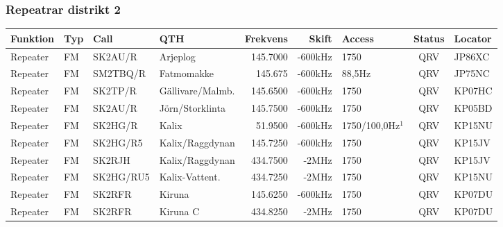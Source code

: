 \begin{landscape}
\subsubsection{Repeatrar distrikt 2}
\footnotesize
\begin{longtable}{llllrrlcl}
\textbf{Funktion}                 & \textbf{Typ}  & \textbf{Call} & \textbf{QTH}        & \textbf{Frekvens} & \textbf{Skift} & \textbf{Access}  & \textbf{Status} & \textbf{Locator} \\ \hline \endhead
Repeater                          & FM            & SK2AU/R       & Arjeplog            & 145.7000          & -600kHz        & 1750             & QRV             & JP86XC           \\
Repeater                          & FM            & SM2TBQ/R      & Fatmomakke          & 145.675           & -600kHz        & 88,5Hz           & QRV             & JP75NC           \\
Repeater                          & FM            & SK2TP/R       & Gällivare/Malmb.    & 145.6500          & -600kHz        & 1750             & QRV             & KP07HC           \\
Repeater                          & FM            & SK2AU/R       & Jörn/Storklinta     & 145.7500          & -600kHz        & 1750             & QRV             & KP05BD           \\
Repeater                          & FM            & SK2HG/R       & Kalix               & 51.9500           & -600kHz        & 1750/100,0Hz$^1$ & QRV             & KP15NU           \\
Repeater                          & FM            & SK2HG/R5      & Kalix/Raggdynan     & 145.7250          & -600kHz        & 1750             & QRV             & KP15JV           \\
Repeater                          & FM            & SK2RJH        & Kalix/Raggdynan     & 434.7500          & -2MHz          & 1750             & QRV             & KP15JV           \\
Repeater                          & FM            & SK2HG/RU5     & Kalix-Vattent.      & 434.7250          & -2MHz          & 1750             & QRV             & KP15NU           \\
Repeater                          & FM            & SK2RFR        & Kiruna              & 145.6250          & -600kHz        & 1750             & QRV             & KP07DU           \\
Repeater                          & FM            & SK2RFR        & Kiruna C            & 434.8250          & -2MHz          & 1750             & QRV             & KP07DU           \\

\end{longtable}
\end{landscape}
